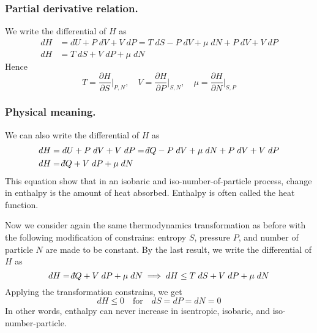 \documentclass[../../../Main.tex]{subfiles}
\begin{document}
\subsubsection*{Partial derivative relation.} We write the differential of $H$ as
\begin{align*}
    dH&=dU+P\;dV+V\;dP=T\;dS-P\;dV+\mu\;dN+P\;dV+V\;dP\\
    dH&=T\;dS+V\;dP+\mu\;dN
\end{align*}
Hence
\begin{equation*}
    T=\frac{\partial H}{\partial S}\bigg|_{P,N}, \quad V=\frac{\partial H}{\partial P}\bigg|_{S,N},\quad \mu=\frac{\partial H}{\partial N}\bigg|_{S,P}
\end{equation*}

\subsubsection*{Physical meaning.} We can also write the differential of $H$ as 
\begin{align*}
    dH&=dU+P\;dV+V\;dP=\dbar Q-P\;dV+\mu\;dN+P\;dV+V\;dP\\
    dH&=\dbar Q+V\;dP+\mu\;dN
\end{align*}
This equation show that in an isobaric and iso-number-of-particle process, change in enthalpy is the amount of heat absorbed. Enthalpy is often called the heat function.

Now we consider again the same thermodynamics transformation as before with the following modification of constrains: entropy $S$, pressure $P$, and number of particle $N$ are made to be constant. By the last result, we write the differential of $H$ as 
\begin{equation*}
    dH=\dbar Q+V\;dP+\mu\;dN\implies dH\leq T\;dS+V\;dP+\mu\;dN
\end{equation*}
Applying the transformation constrains, we get 
\begin{equation*}
    dH\leq 0 \quad\text{for}\quad dS=dP=dN=0
\end{equation*}
In other words, enthalpy can never increase in isentropic, isobaric, and iso-number-particle.
\end{document}

